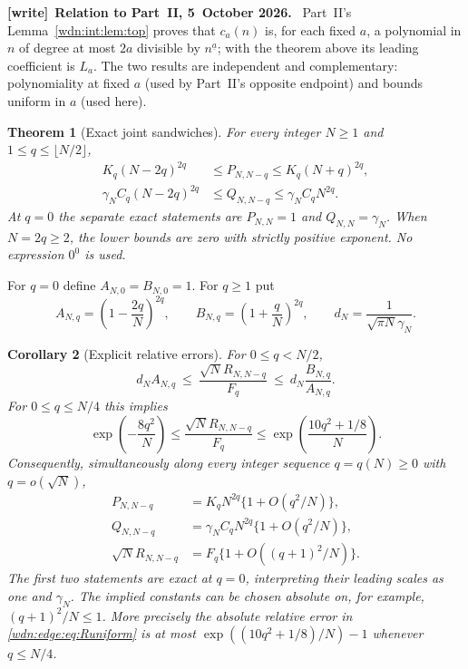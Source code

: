 \documentclass[11pt,letterpaper]{article}
\newtheorem{theorem}{Theorem}[section]
\newtheorem{corollary}[theorem]{Corollary}
\theoremstyle{remark}\newtheorem{remark}[theorem]{Remark}
\newcommand{\fall}[2]{#1^{\underline{#2}}}
\newenvironment{writenote}[1][]{\par\smallskip\begingroup\small
 \noindent\textbf{[write]}\if\relax\detokenize{#1}\relax\else~\textbf{#1.}\fi\ }%
 {\par\endgroup\smallskip}
\begin{document}
\begin{writenote}[Relation to Part~II, 5~October 2026]
Part~II's Lemma~\ref{wdn:int:lem:top} proves that $c_a(n)$ is, for each fixed $a$, a polynomial in $n$ of degree at most $2a$ divisible by $\fall na$; with the theorem above its leading coefficient is $L_a$. The two results are independent and complementary: polynomiality at fixed $a$ (used by Part~II's opposite endpoint) and bounds uniform in $a$ (used here).
\end{writenote}

\begin{theorem}[Exact joint sandwiches]\label{wdn:edge:thm:sandwich}
For every integer $N\ge1$ and $1\le q\le\lfloor N/2\rfloor$,
\begin{align}
 K_q(N-2q)^{2q}&\le P_{N,N-q}\le K_q(N+q)^{2q},\label{wdn:edge:eq:Psand}\\
 \gamma_N C_q(N-2q)^{2q}&\le Q_{N,N-q}
                       \le\gamma_N C_qN^{2q}.\label{wdn:edge:eq:Qsand}
\end{align}
At $q=0$ the separate exact statements are $P_{N,N}=1$ and
$Q_{N,N}=\gamma_N$. When $N=2q\ge2$, the lower bounds are zero with
strictly positive exponent. No expression $0^0$ is used.
\end{theorem}

For $q=0$ define $A_{N,0}=B_{N,0}=1$. For $q\ge1$ put
\begin{equation}\label{wdn:edge:eq:ABd}
 A_{N,q}=\left(1-\frac{2q}{N}\right)^{2q},\qquad
 B_{N,q}=\left(1+\frac qN\right)^{2q},\qquad
 d_N=\frac1{\sqrt{\pi N}\gamma_N}.
\end{equation}
\begin{corollary}[Explicit relative errors]\label{wdn:edge:cor:uniform}
For $0\le q<N/2$,
\begin{equation}\label{wdn:edge:eq:ratioexact}
 d_N A_{N,q}\ \le\ \frac{\sqrt N R_{N,N-q}}{F_q}
                 \ \le\ d_N\frac{B_{N,q}}{A_{N,q}}.
\end{equation}
For $0\le q\le N/4$ this implies
\begin{equation}\label{wdn:edge:eq:exponential}
 \exp\left(-\frac{8q^2}{N}\right)
 \le\frac{\sqrt N R_{N,N-q}}{F_q}
 \le\exp\left(\frac{10q^2+1/8}{N}\right).
\end{equation}
Consequently, simultaneously along every integer sequence
$q=q(N)\ge0$ with $q=o(\sqrt N)$,
\begin{align}
 P_{N,N-q}&=K_qN^{2q}\{1+O(q^2/N)\},\label{wdn:edge:eq:Puniform}\\
 Q_{N,N-q}&=\gamma_N C_qN^{2q}\{1+O(q^2/N)\},\label{wdn:edge:eq:Quniform}\\
 \sqrt N R_{N,N-q}&=F_q\{1+O((q+1)^2/N)\}.\label{wdn:edge:eq:Runiform}
\end{align}
The first two statements are exact at $q=0$, interpreting their leading
scales as one and $\gamma_N$. The implied constants can be chosen absolute
on, for example, $(q+1)^2/N\le1$. More precisely the absolute relative
error in \eqref{wdn:edge:eq:Runiform} is at most
$\exp((10q^2+1/8)/N)-1$ whenever $q\le N/4$.
\end{corollary}
\end{document}
